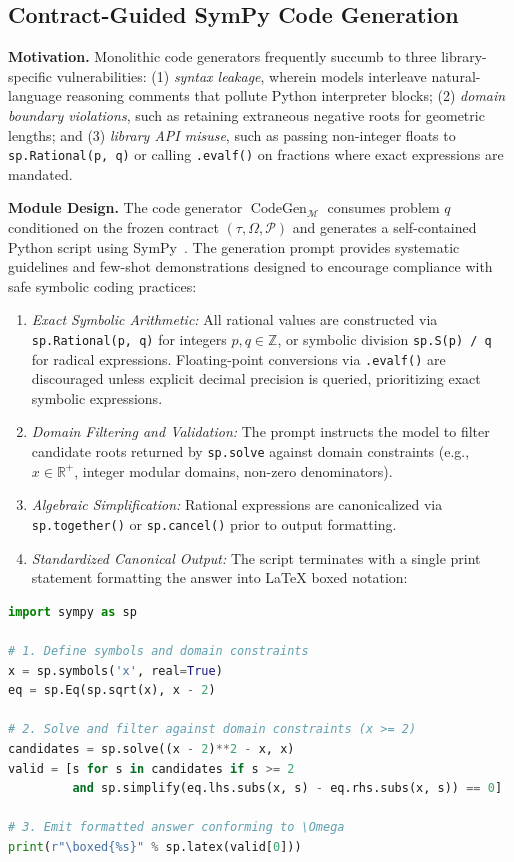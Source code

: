 \documentclass[conference,a4paper]{IEEEtran}
\begin{document}
\subsection{Contract-Guided SymPy Code Generation}
\label{sec:codegen}

\textbf{Motivation.} Monolithic code generators frequently succumb to three library-specific vulnerabilities: (1) \textit{syntax leakage}, wherein models interleave natural-language reasoning comments that pollute Python interpreter blocks; (2) \textit{domain boundary violations}, such as retaining extraneous negative roots for geometric lengths; and (3) \textit{library API misuse}, such as passing non-integer floats to \texttt{sp.Rational(p, q)} or calling \texttt{.evalf()} on fractions where exact expressions are mandated.

\textbf{Module Design.} The code generator $\operatorname{CodeGen}_{\mathcal{M}}$ consumes problem $q$ conditioned on the frozen contract $(\tau, \Omega, \mathcal{P})$ and generates a self-contained Python script using SymPy~\cite{meurer2017sympy}. The generation prompt provides systematic guidelines and few-shot demonstrations designed to encourage compliance with safe symbolic coding practices:
\begin{enumerate}
    \item \textit{Exact Symbolic Arithmetic:} All rational values are constructed via \texttt{sp.Rational(p, q)} for integers $p, q \in \mathbb{Z}$, or symbolic division \texttt{sp.S(p) / q} for radical expressions. Floating-point conversions via \texttt{.evalf()} are discouraged unless explicit decimal precision is queried, prioritizing exact symbolic expressions.
    \item \textit{Domain Filtering and Validation:} The prompt instructs the model to filter candidate roots returned by \texttt{sp.solve} against domain constraints (e.g., $x \in \mathbb{R}^+$, integer modular domains, non-zero denominators).
    \item \textit{Algebraic Simplification:} Rational expressions are canonicalized via \texttt{sp.together()} or \texttt{sp.cancel()} prior to output formatting.
    \item \textit{Standardized Canonical Output:} The script terminates with a single print statement formatting the answer into \LaTeX{} boxed notation:
\end{enumerate}
\begin{lstlisting}[style=promptstyle,language=Python]
import sympy as sp

# 1. Define symbols and domain constraints
x = sp.symbols('x', real=True)
eq = sp.Eq(sp.sqrt(x), x - 2)

# 2. Solve and filter against domain constraints (x >= 2)
candidates = sp.solve((x - 2)**2 - x, x)
valid = [s for s in candidates if s >= 2 
         and sp.simplify(eq.lhs.subs(x, s) - eq.rhs.subs(x, s)) == 0]

# 3. Emit formatted answer conforming to \Omega
print(r"\boxed{%s}" % sp.latex(valid[0]))
\end{lstlisting}
\end{document}
